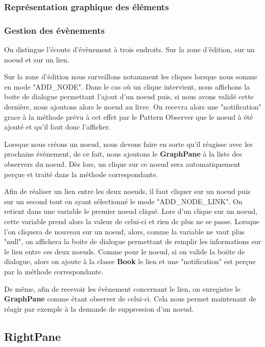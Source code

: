 			\subsubsection{Représentation graphique des éléments}

				

			\subsubsection{Gestion des évènements}

				On distingue l'écoute d'évènement à trois endroits. Sur la zone d'édition, sur un noeud et sur un lien.

				Sur la zone d'édition nous surveillons notamment les cliques lorsque nous somme en mode "ADD\_NODE". Dans le cas où un clique intervient, nous affichons la boite de dialogue permettant l'ajout d'un noeud puis, si nous avons validé cette dernière, nous ajoutons alors le noeud au livre. On recevra alors une "notification" grace à la méthode prévu à cet effet par le Pattern Observer que le noeud à été ajouté et qu'il faut donc l'afficher.

				Lorsque nous créons un noeud, nous devons faire en sorte qu'il réagisse avec les prochains évènement, de ce fait, nous ajoutons le \textbf{GraphPane} à la liste des observers du noeud. Dès lors, un clique sur ce noeud sera automatiquement perçue et traité dans la méthode correspondante.

				Afin de réaliser un lien entre les deux noeuds, il faut cliquer sur un noeud puis sur un second tout en ayant sélectionné le mode "ADD\_NODE\_LINK". On retient dans une variable le premier noeud cliqué. Lors d'un clique sur un noeud, cette variable prend alors la valeur de celui-ci et rien de plus ne se passe. Lorsque l'on cliquera de nouveau sur un noeud, alors, comme la variable ne vaut plus "null", on affichera la boite de dialogue permettant de remplir les informations sur le lien entre ces deux noeuds. Comme pour le noeud, si on valide la boiite de dialogue, alors on ajoute à la classe \textbf{Book} le lien et une "notification" est perçue par la méthode correspondante.

				De même, afin de recevoir les évènement concernant le lien, on enregistre le \textbf{GraphPane} comme étant observer de celui-ci. Cela nous permet maintenant de réagir par exemple à la demande de suppression d'un noeud.

		\subsection{RightPane}

